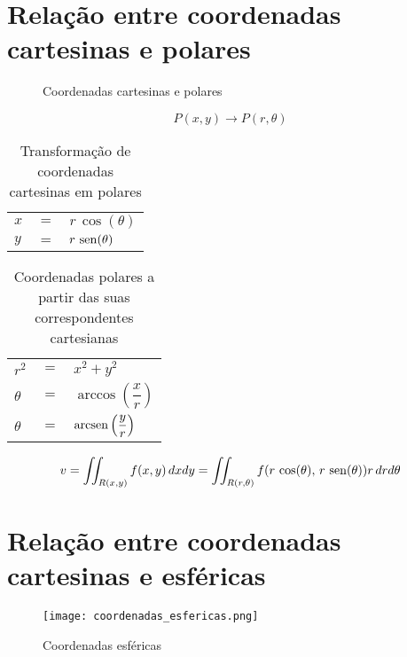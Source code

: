 \section{Relação entre coordenadas cartesinas e polares}
	\begin{figure}[H]
		\caption{Coordenadas cartesinas e polares}
		\label{coordenada_cartesiana_polar}
		\centering		
		\quad\quad
	\end{figure}
	
	$$P(x,y) \rightarrow P(r,\theta)$$
	
	\begin{table}[H]
		\caption{Transformação de coordenadas cartesinas em polares}
		\label{transformacao_coordenadas_cartesianas_polares}
		\centering		
		\begin{tabular}{|lcl|}
			$x$ & $=$ & $r\,\cos(\theta) $ \\
			$y$ & $=$ & $r\,\operatorname{sen}(\theta)$
		\end{tabular}		
	\end{table}
	\begin{table}[H]
		\caption{Coordenadas polares a partir das suas correspondentes cartesianas}
		\label{correpondentes_coordenadas_cartesianas_polares}
		\centering		
		\begin{tabular}{|lcl|}
			$r^2$    & $=$ & $x^2 + y^2$                        \\
			$\theta$ & $=$ & $\arccos\left(\dfrac{x}{r}\right)$ \\
			$\theta$ & $=$ & $\operatorname{arcsen}\left(\dfrac{y}{r}\right)$
		\end{tabular}		
	\end{table}
	
	\begin{equation*}
		v = \iint_{R(x,y)} f(x,y)\, dxdy = \iint_{R(r,\theta)} f(r\,\cos(\theta),\,r\,\operatorname{sen}(\theta)) r\,drd\theta
	\end{equation*}
	
\section{Relação entre coordenadas cartesinas e esféricas}
	
	\begin{figure}[H]
		\caption{Coordenadas esféricas}
		\label{coordenadas_esfericas}
		\centering
		\texttt{[image: coordenadas\_esfericas.png]}		
	\end{figure}
	
